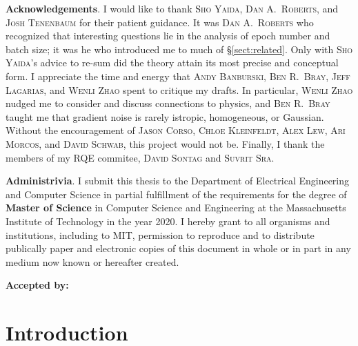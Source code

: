 \documentclass[openany, notitlepage, justified]{tufte-book}
\theoremstyle{plain}
\theoremstyle{definition}
\begin{document}
    \vspace{1cm}
    \textbf{Acknowledgements}.
        I would like to thank \textsc{Sho Yaida}, \textsc{Dan A.\ Roberts},
        and \textsc{Josh Tenenbaum} for their patient guidance.
        It was \textsc{Dan A.\ Roberts} who recognized that interesting
        questions lie in the analysis of epoch number and batch size; it was he
        who introduced me to much of \S\ref{sect:related}.  Only with
        \textsc{Sho Yaida}'s advice to re-sum did the theory attain its most
        precise and conceptual form.
        I appreciate the time and energy that \textsc{Andy Banburski},
        \textsc{Ben R.\ Bray}, \textsc{Jeff Lagarias}, and \textsc{Wenli Zhao}
        spent to critique my drafts.  In particular, \textsc{Wenli Zhao}
        nudged me to consider and discuss connections to physics, and
        \textsc{Ben R.\ Bray} taught me that gradient noise is rarely istropic,
        homogeneous, or Gaussian.  
        Without the encouragement of \textsc{Jason Corso}, \textsc{Chloe
        Kleinfeldt}, \textsc{Alex Lew}, \textsc{Ari Morcos}, and \textsc{David
        Schwab}, this project would not be.
        Finally, I thank the members of my RQE commitee,
        \textsc{David Sontag} and \textsc{Suvrit Sra}.

    \vspace{1cm}
    \textbf{Administrivia}.
        I submit this thesis to the Department of Electrical Engineering and
        Computer Science in partial fulfillment of the requirements for the
        degree of \textbf{Master of Science} in Computer Science and
        Engineering at the Massachusetts Institute of Technology in the year
        2020.  I hereby grant to all organisms and institutions, including to
        MIT, permission to reproduce and to distribute publically paper and
        electronic copies of this document in whole or in part in any medium
        now known or hereafter created.

    \vspace{1cm}
    \textbf{Accepted by:}
        \hrulefill
 
    \restoregeometry
    

\chapter{Introduction}
\end{document}
